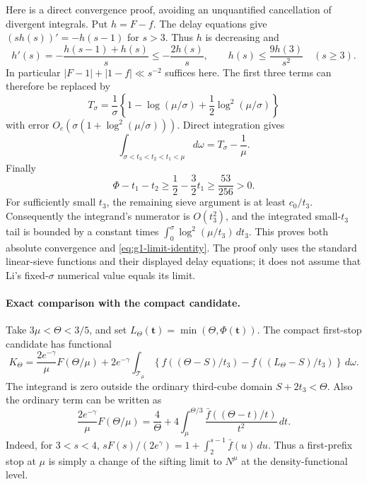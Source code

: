 Here is a direct convergence proof, avoiding an unquantified
cancellation of divergent integrals. Put $h=F-f$. The
delay equations give $(sh(s))'=-h(s-1)$ for $s>3$.
Thus $h$ is decreasing and
\[
 h'(s)=-\frac{h(s-1)+h(s)}s\le-\frac{2h(s)}s,
 \qquad h(s)\le\frac{9h(3)}{s^2}\quad(s\ge3).
\]
In particular $|F-1|+|1-f|\ll s^{-2}$ suffices here.
The first three terms can therefore be replaced by
\[
 T_\sigma=\frac1\sigma
    \left\{1-\log(\mu/\sigma)+\frac12\log^2(\mu/\sigma)\right\}
\]
with error $O_c(\sigma(1+\log^2(\mu/\sigma)))$.
Direct integration gives
\[
 \int_{\sigma<t_3<t_2<t_1<\mu}d\omega=T_\sigma-\frac1\mu.
\]
Finally
\[
 \Phi-t_1-t_2\ge\frac12-\frac32t_1
       \ge\frac{53}{256}>0.
\]
For sufficiently small $t_3$, the remaining sieve argument is
at least $c_0/t_3$. Consequently the integrand's numerator is
$O(t_3^2)$, and the integrated small-$t_3$ tail is bounded by a
constant times $\int_0^\sigma\log^2(\mu/t_3)\,dt_3$.
This proves both absolute convergence and
\eqref{eq:g1-limit-identity}. The proof only uses the standard
linear-sieve functions and their displayed delay equations;
it does not assume that Li's fixed-$\sigma$ numerical value equals
its limit.

\paragraph{Exact comparison with the compact candidate.}
Take $3\mu<\Theta<3/5$, and set
$L_\Theta(\boldsymbol t)=\min(\Theta,\Phi(\boldsymbol t))$.
The compact first-stop candidate has functional
\begin{equation}\label{eq:compact-g1-functional}
 K_\Theta=
 \frac{2e^{-\gamma}}\mu F(\Theta/\mu)
 +2e^{-\gamma}\int_{\mathcal T_\mu}
       \left\{f((\Theta-S)/t_3)
                    -f((L_\Theta-S)/t_3)\right\}\,d\omega.
\end{equation}
The integrand is zero outside the ordinary third-cube domain
$S+2t_3<\Theta$. Also the ordinary term can be written as
\begin{equation}\label{eq:first-stop-base-identity}
 \frac{2e^{-\gamma}}\mu F(\Theta/\mu)
 =\frac4\Theta+
   4\int_\mu^{\Theta/3}
       \frac{\bar f((\Theta-t)/t)}{t^2}\,dt.
\end{equation}
Indeed, for $3<s<4$,
$sF(s)/(2e^\gamma)=1+\int_2^{s-1}\bar f(u)\,du$.
Thus a first-prefix stop at $\mu$ is simply a change of the
sifting limit to $N^\mu$ at the density-functional level.

